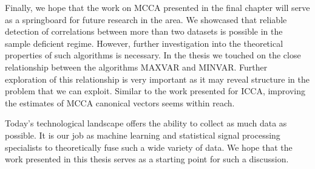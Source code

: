 Finally, we hope that the work on MCCA presented in the final chapter will serve as a
springboard for future research in the area. We showcased that reliable detection of
correlations between more than two datasets is possible in the sample deficient
regime. However, further investigation into the theoretical properties of such algorithms
is necessary. In the thesis we touched on the close relationship between the algorithms
MAXVAR and MINVAR. Further exploration of this relationship is very important as it may
reveal structure in the problem that we can exploit. Similar to the work presented for
ICCA, improving the estimates of MCCA canonical vectors seems within reach.

Today's technological landscape offers the ability to collect as much data as possible. It
is our job as machine learning and statistical signal processing specialists to
theoretically fuse such a wide variety of data. We hope that the work presented in this
thesis serves as a starting point for such a discussion. 


